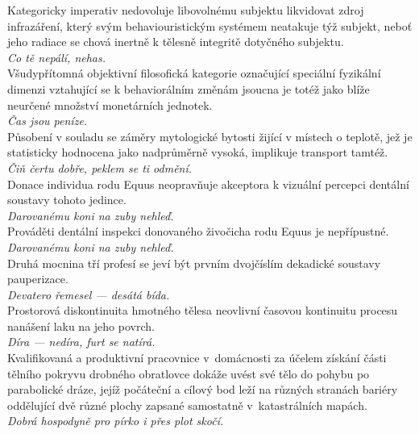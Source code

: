 \begin{multicols}{\value{columnsgames}}
\noindent
Kategoricky imperativ nedovoluje libovolnému subjektu likvidovat
zdroj infrazáření, který svým behaviouristickým systémem neatakuje
týž subjekt, neboť jeho radiace se chová inertně k tělesně integritě
dotyčného subjektu.\\[1 mm]
{\sl Co tě nepálí, nehas.}\\

\noindent
Všudypřítomná objektivní filosofická kategorie označující
speciální fyzikální dimenzi vztahující se k behaviorálním změnám
jsoucna je totéž jako blíže neurčené množství monetárních jednotek.\\[1 mm]
{\sl Čas jsou peníze.}\\

\noindent
Působení v souladu se záměry mytologické bytosti žijící v
místech o teplotě, jež je statisticky hodnocena jako nadprůměrně
vysoká, implikuje transport tamtéž.\\[1 mm]
{\sl Čiň čertu dobře, peklem se ti odmění.}\\

\noindent
Donace individua rodu Equus neopravňuje akceptora k vizuální
percepci dentální soustavy tohoto jedince.\\[1 mm]
{\sl Darovanému koni na zuby nehleď.}\\

\noindent
Prováděti dentální inspekci donovaného živočicha rodu Equus
je nepřípustné.\\[1 mm]
{\sl Darovanému koni na zuby nehleď.}\\

\noindent
Druhá mocnina tří profesí se jeví být prvním dvojčíslím dekadické
soustavy pauperizace.\\[1 mm]
{\sl Devatero řemesel --- desátá bída.}\\

\noindent
Prostorová diskontinuita hmotného tělesa neovlivní časovou
kontinuitu procesu nanášení laku na jeho povrch.\\[1 mm]
{\sl Díra --- nedíra, furt se natírá.}\\

\noindent
Kvalifikovaná a produktivní pracovnice v~domácnosti
za účelem získání části tělního pokryvu drobného obratlovce dokáže
uvést své tělo do pohybu po parabolické dráze, jejíž počáteční
a cílový bod leží na různých stranách bariéry oddělující dvě
různé plochy zapsané samostatně v~katastrálních mapách.\\[1 mm]
{\sl Dobrá hospodyně pro pírko i přes plot skočí.}\\


\end{multicols}
